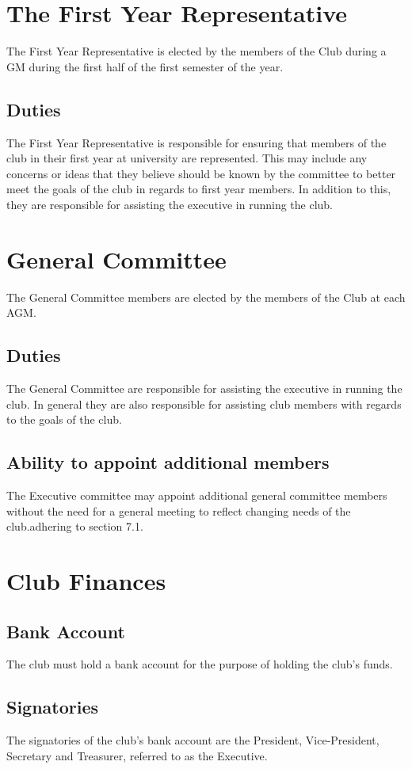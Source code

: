 \documentclass[11pt]{article}
\begin{document}
\section{The First Year Representative}
The First Year Representative is elected by the members of the Club during a GM during the first half of the first semester of the year.
\subsection{Duties}
The First Year Representative is responsible for ensuring that members of the club in their first year at university are represented. This may include any concerns or ideas that they believe should be known by the committee to better meet the goals of the club in regards to first year members. In addition to this, they are responsible for assisting the executive in running the club.

\section{General Committee}
The General Committee members are elected by the members of the Club at each AGM.
\subsection{Duties}
The General Committee are responsible for assisting the executive in running the club. In general they are also responsible for assisting club members with regards to the goals of the club.
\subsection{Ability to appoint additional members}
The Executive committee may appoint additional general committee members without the need for a general meeting to reflect changing needs of the club.adhering to section 7.1.

\section{Club Finances}
\subsection{Bank Account}
The club must hold a bank account for the purpose of holding the club’s funds.
\subsection{Signatories}
The signatories of the club’s bank account are the President, Vice-President, Secretary and Treasurer, referred to as the Executive.
\end{document}
